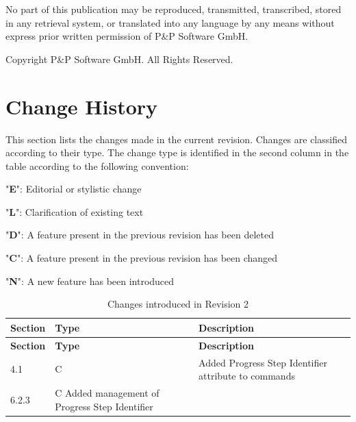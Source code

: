 \documentclass[a4paper,10pt]{article}
\let\stdsection\section
\renewcommand\section{\newpage\stdsection}
\newenvironment{fw_itemize}						%
{\begin{itemize}
  \setlength{\itemsep}{1mm}
  \setlength{\parskip}{0pt}
  \setlength{\parsep}{0pt}}
{\end{itemize}}
\begin{document}
\newpage
\vspace*{\fill}
\begin{center}
No part of this publication may be reproduced, transmitted, transcribed, stored in any retrieval system, or translated into any language by any means without express prior written permission of P\&P Software GmbH.
\end{center}

\begin{center}
Copyright  P\&P Software GmbH. All Rights Reserved. 
\end{center}
\vspace*{\fill}

\newpage
\tableofcontents

\newpage
\listoffigures
\listoftables

\newpage

\setlength{\parskip}{3mm}						%

\section{Change History}

This section lists the changes made in the current revision. Changes are classified according to their type. The change type is identified in the second column in the table according to the following convention:

\begin{fw_itemize}
\item "\textbf{E}": Editorial or stylistic change
\item "\textbf{L}": Clarification of existing text
\item "\textbf{D}": A feature present in the previous revision has been deleted
\item "\textbf{C}": A feature present in the previous revision has been changed
\item "\textbf{N}": A new feature has been introduced
\end{fw_itemize}


\begin{longtable}{|p{1.5cm}|p{1cm}|p{8cm}|}
\caption{Changes introduced in Revision 2}  \\
\hline
\rowcolor{light-gray}
\textbf{Section} & \textbf{Type} & \textbf{Description} \\
\hline\hline
\endfirsthead
\rowcolor{light-gray}
\textbf{Section} & \textbf{Type} & \textbf{Description} \\
\hline\hline
\endhead
4.1 & C & Added Progress Step Identifier attribute to commands \\
\hline
6.2.3 & C Added management of Progress Step Identifier \\
\hline
\end{longtable}
\end{document}
